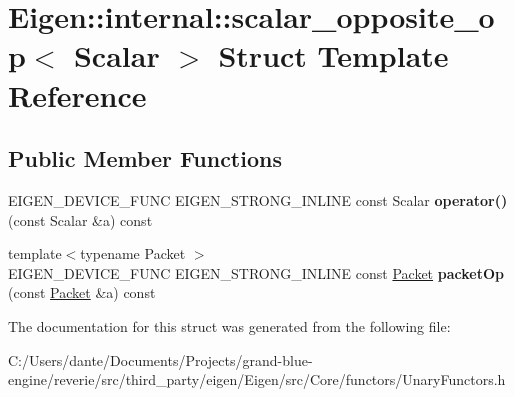 \hypertarget{struct_eigen_1_1internal_1_1scalar__opposite__op}{}\section{Eigen\+::internal\+::scalar\+\_\+opposite\+\_\+op$<$ Scalar $>$ Struct Template Reference}
\label{struct_eigen_1_1internal_1_1scalar__opposite__op}
\subsection*{Public Member Functions}
\begin{DoxyCompactItemize}
\item 
\mbox{\label{struct_eigen_1_1internal_1_1scalar__opposite__op_ae5f9a5f4b661f02f01cf88b30ed24695}} 
E\+I\+G\+E\+N\+\_\+\+D\+E\+V\+I\+C\+E\+\_\+\+F\+U\+NC E\+I\+G\+E\+N\+\_\+\+S\+T\+R\+O\+N\+G\+\_\+\+I\+N\+L\+I\+NE const Scalar {\bfseries operator()} (const Scalar \&a) const
\item 
\mbox{\label{struct_eigen_1_1internal_1_1scalar__opposite__op_a2ad34e316a311a4f94a2e0493033acbc}} 
{\footnotesize template$<$typename Packet $>$ }\\E\+I\+G\+E\+N\+\_\+\+D\+E\+V\+I\+C\+E\+\_\+\+F\+U\+NC E\+I\+G\+E\+N\+\_\+\+S\+T\+R\+O\+N\+G\+\_\+\+I\+N\+L\+I\+NE const \mbox{\hyperlink{union_eigen_1_1internal_1_1_packet}{Packet}} {\bfseries packet\+Op} (const \mbox{\hyperlink{union_eigen_1_1internal_1_1_packet}{Packet}} \&a) const
\end{DoxyCompactItemize}


The documentation for this struct was generated from the following file\+:\begin{DoxyCompactItemize}
\item 
C\+:/\+Users/dante/\+Documents/\+Projects/grand-\/blue-\/engine/reverie/src/third\+\_\+party/eigen/\+Eigen/src/\+Core/functors/Unary\+Functors.\+h\end{DoxyCompactItemize}
